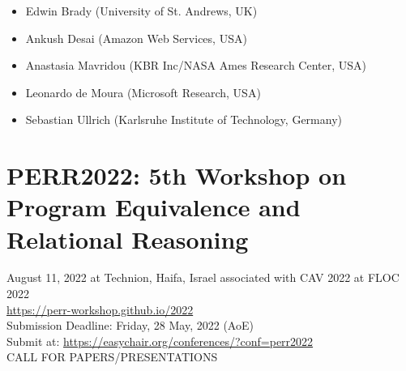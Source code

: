 \documentclass[prodmode,acmtecs]{acmsmall} %
\begin{document}
\begin{itemize}
\begin{itemize}\item  Edwin Brady (University of St. Andrews, UK)
\item  Ankush Desai (Amazon Web Services, USA)
\item  Anastasia Mavridou (KBR Inc/NASA Ames Research Center, USA)
\item  Leonardo de Moura (Microsoft Research, USA)
\item  Sebastian Ullrich (Karlsruhe Institute of Technology, Germany)
\end{itemize} 
\end{itemize}\section{PERR2022: 5th Workshop on Program Equivalence and Relational Reasoning }\label{PERR2022}  August 11, 2022 at Technion, Haifa, Israel associated with CAV 2022 at FLOC 2022 \\ 
  \href{https://perr-workshop.github.io/2022}{https://perr-workshop.github.io/2022}\\ 
  Submission Deadline: Friday, 28 May, 2022 (AoE)\\ 
  Submit at: \href{https://easychair.org/conferences/?conf=perr2022}{https://easychair.org/conferences/?conf=perr2022}\\ 
CALL FOR PAPERS/PRESENTATIONS 
\end{document}
